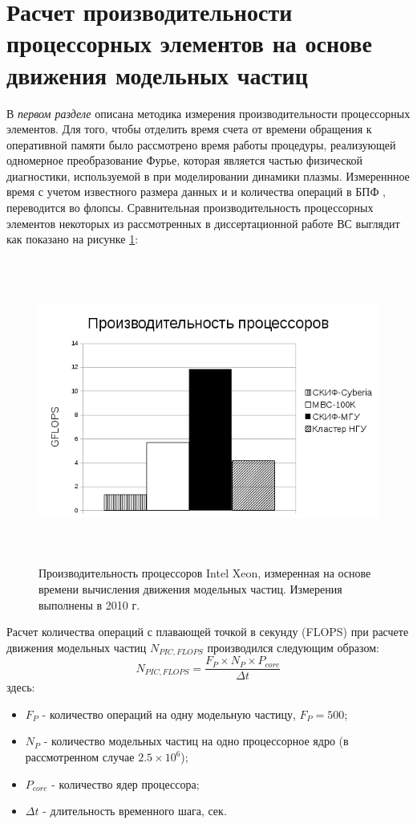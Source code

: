 \section{Расчет производительности процессорных элементов на основе движения модельных частиц}
\label{calc_PE}
В \textit{первом разделе} описана методика измерения производительности процессорных элементов.
Для того, чтобы отделить время счета от времени обращения к оперативной памяти было рассмотрено время работы процедуры,
реализующей одномерное преобразование Фурье, которая является частью физической диагностики, используемой в при моделировании динамики плазмы. Измереннное время с учетом известного размера данных и и количества операций в БПФ , переводится во флопсы. Сравнительная производительность процессорных элементов некоторых из рассмотренных в диссертационной работе ВС выглядит как показано на рисунке  \ref{procs_flops_pic}:

\begin{figure}[htb]
	\begin{center}
		\includegraphics[height=10cm,keepaspectratio]{images/processor_FLOPS_PIC.png}
	\end{center}
	\caption{Производительность процессоров Intel Xeon, измеренная на основе времени вычисления движения модельных частиц. Измерения выполнены в 2010 г.}
	\label{procs_flops_pic}
\end{figure} 

Расчет количества операций с плавающей точкой в секунду (FLOPS) при расчете движения модельных частиц $N_{PIC,FLOPS}$ производился следующим образом:
$$
N_{PIC,FLOPS} = \frac{F_P\times N_P \times P_{core}}{\Delta t}
$$
здесь:
\begin{itemize}
	\item $F_P$ - количество операций на одну модельную частицу, $F_P = 500$;
	\item $N_P$ - количество модельных частиц на одно процессорное ядро (в рассмотренном случае $2.5\times 10^6$);  
	\item $P_{core}$ - количество ядер процессора;
	\item $\Delta t$  - длительность временного шага, сек.
\end{itemize}	

